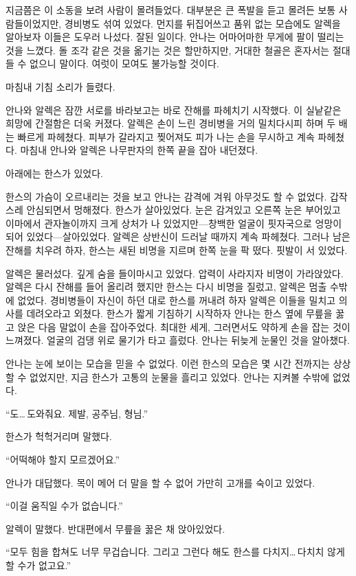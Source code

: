 지금쯤은 이 소동을 보려 사람이 몰려들었다. 대부분은 큰 폭발을 듣고 몰려든 보통 사람들이었지만, 경비병도 섞여 있었다. 먼지를 뒤집어쓰고 품위 없는 모습에도 알렉을 알아보자 이들은 도우러 나섰다. 잘된 일이다. 안나는 어마어마한 무게에 팔이 떨리는 것을 느꼈다. 돌 조각 같은 것을 옮기는 것은 할만하지만, 거대한 철골은 혼자서는 절대 들 수 없으니 말이다. 여럿이 모여도 불가능할 것이다.

마침내 기침 소리가 들렸다.

안나와 알렉은 잠깐 서로를 바라보고는 바로 잔해를 파헤치기 시작했다. 이 실낱같은 희망에 간절함은 더욱 커졌다. 알렉은 손이 느린 경비병을 거의 밀치다시피 하며 두 배는 빠르게 파헤쳤다. 피부가 갈라지고 찢어져도 피가 나는 손을 무시하고 계속 파헤쳤다. 마침내 안나와 알렉은 나무판자의 한쪽 끝을 잡아 내던졌다.

아래에는 한스가 있었다.

한스의 가슴이 오르내리는 것을 보고 안나는 감격에 겨워 아무것도 할 수 없었다. 갑작스레 안심되면서 멍해졌다. 한스가 살아있었다. 눈은 감겨있고 오른쪽 눈은 부어있고 이마에서 관자놀이까지 크게 상처가 나 있었지만—창백한 얼굴이 핏자국으로 엉망이 되어 있었다—살아있었다. 알렉은 상반신이 드러날 때까지 계속 파헤쳤다. 그러나 남은 잔해를 치우려 하자, 한스는 새된 비명을 지르며 한쪽 눈을 팍 떴다. 핏발이 서 있었다.

알렉은 물러섰다. 깊게 숨을 들이마시고 있었다. 압력이 사라지자 비명이 가라앉았다. 알렉은 다시 잔해를 들어 올리려 했지만 한스는 다시 비명을 질렀고, 알렉은 멈출 수밖에 없었다. 경비병들이 자신이 하던 대로 한스를 꺼내려 하자 알렉은 이들을 밀치고 의사를 데려오라고 외쳤다. 한스가 짧게 기침하기 시작하자 안나는 한스 옆에 무릎을 꿇고 앉은 다음 말없이 손을 잡아주었다. 최대한 세게, 그러면서도 약하게 손을 잡는 것이 느껴졌다. 얼굴의 검댕 위로 물기가 타고 흘렀다. 안나는 뒤늦게 눈물인 것을 알아챘다.

안나는 눈에 보이는 모습을 믿을 수 없었다. 이런 한스의 모습은 몇 시간 전까지는 상상할 수 없었지만, 지금 한스가 고통의 눈물을 흘리고 있었다. 안나는 지켜볼 수밖에 없었다.

``도\ldots\,도와줘요. 제발, 공주님, 형님.''

한스가 헉헉거리며 말했다.

``어떡해야 할지 모르겠어요.''

안나가 대답했다. 목이 메어 더 말을 할 수 없어 가만히 고개를 숙이고 있었다.

``이걸 움직일 수가 없습니다.''

알렉이 말했다. 반대편에서 무릎을 꿇은 채 앉아있었다.

``모두 힘을 합쳐도 너무 무겁습니다. 그리고 그런다 해도 한스를 다치지\ldots\,다치치 않게 할 수가 없고요.''

